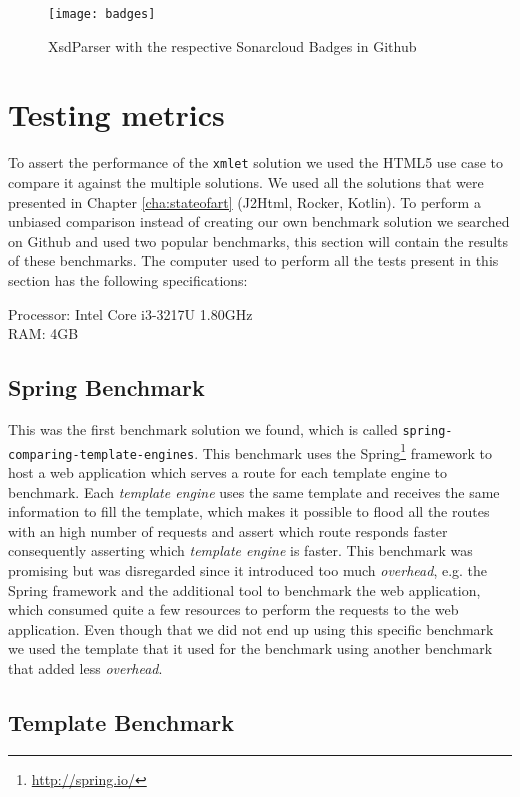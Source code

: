 \begin{figure}[h]
	\centering
	\texttt{[image: badges]}
	\caption{XsdParser with the respective Sonarcloud Badges in Github}
	\label{project_badges}
\end{figure}

\section{Testing metrics} %
\label{sec:testingmetrics}

To assert the performance of the \texttt{xmlet} solution we used the \ac{HTML}5 use case to compare it against the multiple solutions. We used all the solutions that were presented in Chapter \ref{cha:stateofart} (J2Html, Rocker, Kotlin). To perform a unbiased comparison instead of creating our own benchmark solution we searched on Github and used two popular benchmarks, this section will contain the results of these benchmarks. The computer used to perform all the tests present in this section has the following specifications:

Processor: Intel Core i3-3217U 1.80GHz\\
RAM: 4GB

\subsection{Spring Benchmark}
\label{sec:springbenchmark}

This was the first benchmark solution we found, which is called \texttt{spring-comparing-template-engines}\cite{springbenchmark}. This benchmark uses the Spring\footnote{\url{http://spring.io/}} framework to host a web application which serves a route for each template engine to benchmark. Each \textit{template engine} uses the same template and receives the same information to fill the template, which makes it possible to flood all the routes with an high number of requests and assert which route responds faster consequently asserting which \textit{template engine} is faster. This benchmark was promising but was disregarded since it introduced too much \textit{overhead}, e.g. the Spring framework and the additional tool to benchmark the web application, which consumed quite a few resources to perform the requests to the web application. Even though that we did not end up using this specific benchmark we used the template that it used for the benchmark using another benchmark that added less \textit{overhead}.

\subsection{Template Benchmark}
\label{sec:templatebenchmark}


